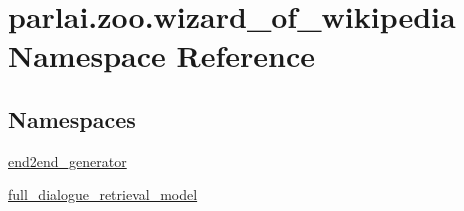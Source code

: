 \hypertarget{namespaceparlai_1_1zoo_1_1wizard__of__wikipedia}{}\section{parlai.\+zoo.\+wizard\+\_\+of\+\_\+wikipedia Namespace Reference}
\label{namespaceparlai_1_1zoo_1_1wizard__of__wikipedia}
\subsection*{Namespaces}
\begin{DoxyCompactItemize}
\item 
 \hyperlink{namespaceparlai_1_1zoo_1_1wizard__of__wikipedia_1_1end2end__generator}{end2end\+\_\+generator}
\item 
 \hyperlink{namespaceparlai_1_1zoo_1_1wizard__of__wikipedia_1_1full__dialogue__retrieval__model}{full\+\_\+dialogue\+\_\+retrieval\+\_\+model}
\end{DoxyCompactItemize}
